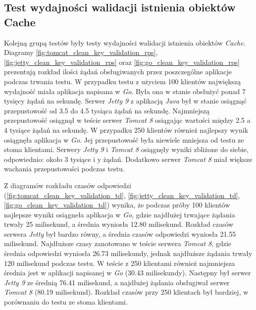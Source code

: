 \subsection{Test wydajności walidacji istnienia obiektów Cache}
Kolejną grupą testów były testy wydajności walidacji istnienia obiektów \textsl{Cache}. Diagramy \ref{fig:tomcat_clean_key_validation_rps},  \ref{fig:jetty_clean_key_validation_rps} oraz  \ref{fig:go_clean_key_validation_rps} prezentują rozkład ilości żądań obsługiwanych przez poszczególne aplikacje podczas trwania testu. W przypadku testu z użyciem 100 klientów największą wydajność miała aplikacja napisana w \textsl{Go}. Była ona w stanie obsłużyć ponad 7 tysięcy żądań na sekundę. Serwer \textsl{Jetty 9} z aplikacją \textsl{Java} był w stanie osiągnąć przepustowość od 3.5 do 4.5 tysiąca żądań na sekundę. Najmniejszą przepustowość osiągnął w teście serwer \textsl{Tomcat 8} osiągając wartości między 2.5 a 4 tysiące żądań na sekundę. W przypadku 250 klientów również najlepszy wynik osiągnęła aplikacja w \textsl{Go}. Jej przepustowość była niewiele mniejsza od testu ze stoma klientami. Serwery \textsl{Jetty 9} i \textsl{Tomcat 8} osiągnęły wyniki zbliżone do siebie, odpowiednio: około 3 tysiące i y żądań. Dodatkowo serwer \textsl{Tomcat 8} miał większe wachania przepustowości podczas testu.

Z diagramów rozkładu czasów odpowiedzi (\ref{fig:tomcat_clean_key_validation_td},  \ref{fig:jetty_clean_key_validation_td}, \ref{fig:go_clean_key_validation_td}) wynika, że podczas próby 100 klientów najlepsze wyniki osiągneła aplikacja w \textsl{Go}, gdzie najdłużej trwające żądania trwały 25 milisekund, a średnia wyniosła 12.80 milisekund. Rozkład czasów serwera \textsl{Jetty} był bardzo równy, a średnia czasów odpowiedzi wyniosła 21.55 milisekund. Najdłuższe czasy zanotowano w teście serwera \textsl{Tomcat 8}, gdzie średnia odpowiedzi wyniosła 26.73 milisekundy, jednak najdłuższe żądania trwały 120 milisekund podczas testu. W teście z 250 klientami również najmniejsza średnia jest w aplikacji napisanej w \textsl{Go} (30.43 milisekundy). Następny był serwer \textsl{Jetty 9} ze średnią 76.41 milisekund, a najdłużej żądania obsługiwał serwer \textsl{Tomcat 8} (80.19 milisekund). Rozkład czasów przy 250 klientach był bardziej, w porównaniu do testu ze stoma klientami.

